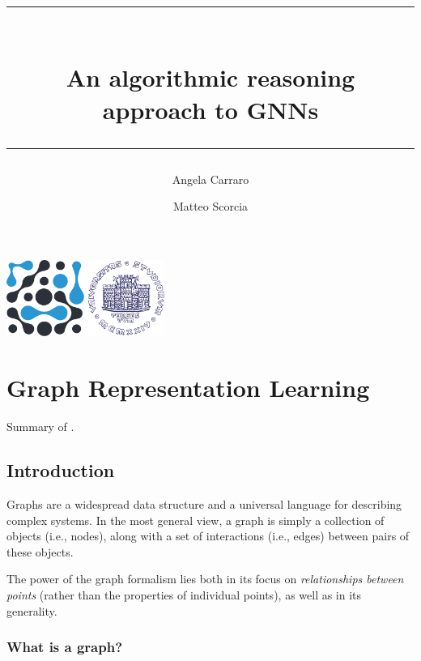 \documentclass[10pt]{book}
\title{\rule{\textwidth}{0.4pt}\\\huge{An algorithmic reasoning\\approach to GNNs}\\\rule{\textwidth}{0.4pt}}
\author{\Large{Angela Carraro}}
\author{\Large{Matteo Scorcia}}
\affil{\Large{DSSC + IN20 - UniTS}}
\date{}
\begin{document}
\begin{minipage}[c][\textheight]{\textwidth}
    \maketitle
    
    \hspace*{20cm}

    \centering
    \includegraphics[height=2.5cm]{figures/logo_dssc_alt.pdf}
    \hspace*{1cm}
    \includegraphics[height=2.5cm]{figures/Logo_units_blu.pdf}

\end{minipage}
\newpage

\tableofcontents

\newpage

\chapter{Graph Representation Learning}

Summary of \cite{HamiltonGRLBook}.

\section{Introduction}
\label{sec:intro}

Graphs are a widespread data structure and a universal language for describing complex systems. In the most general view, a graph is simply a collection of objects (i.e., nodes), along with a set of interactions (i.e., edges) between pairs of these objects.

The power of the graph formalism lies both in its focus on \emph{relationships between points} (rather than the properties of individual points), as well as in its generality.


\subsection{What is a graph?}
\end{document}
